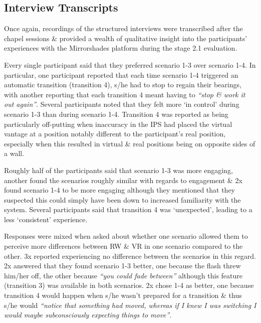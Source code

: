 
\subsection{Interview Transcripts}

Once again, recordings of the structured interviews were transcribed after the chapel sessions \& provided a wealth of qualitative insight into the participants' experiences with the Mirrorshades platform during the stage 2.1 evaluation.

Every single participant said that they preferred scenario 1-3 over scenario 1-4. In particular, one participant  reported that each time scenario 1-4 triggered an automatic transition (transition 4), s/he had to stop to regain their bearings, with another reporting that each transition 4 meant having to \textit{``stop \& work it out again''}. Several participants noted that they felt more `in control' during scenario 1-3 than during scenario 1-4. Transition 4 was reported as being particularly off-putting when inaccuracy in the IPS had placed the virtual vantage at a position notably different to the participant's real position, especially when this resulted in virtual \& real positions being on opposite sides of a wall.

Roughly half of the participants said that scenario 1-3 was more engaging, another found the scenarios roughly similar with regards to engagement \& 2x found scenario 1-4 to be more engaging although they mentioned that they suspected this could simply have been down to increased familiarity with the system. Several participants said that transition 4 was `unexpected', leading to a less `consistent' experience.

Responses were mixed when asked about whether one scenario allowed them to perceive more differences between RW \& VR in one scenario compared to the other. 3x reported experiencing no difference between the scenarios in this regard. 2x answered that they found scenario 1-3 better, one because the flash threw him/her off, the other because \textit{``you could fade between''}  although this feature (transition 3) was available in both scenarios. 2x chose 1-4 as better, one because transition 4 would happen when s/he wasn't prepared for a transition \& thus s/he would \textit{``notice that something had moved, whereas if I knew I was switching I would maybe subconsciously expecting things to move''}.

